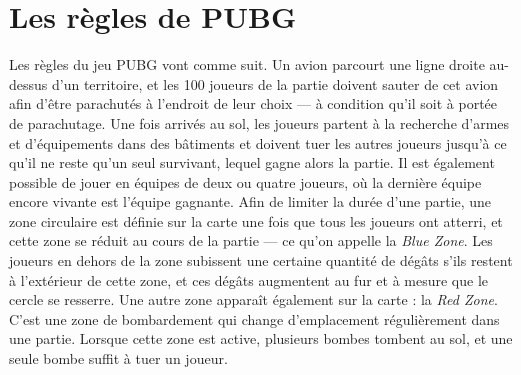 \section{Les règles de PUBG}
Les r\`egles du jeu PUBG vont comme suit.
Un avion parcourt une ligne droite au-dessus d'un territoire, et les 100 joueurs de la partie doivent sauter de cet avion afin d'être parachutés à l'endroit de leur choix --- à condition qu'il soit à portée de parachutage. Une fois arrivés au sol, les joueurs partent à la recherche d'armes et d'équipements dans des bâtiments et doivent tuer les autres joueurs jusqu'à ce qu'il ne reste qu'un seul survivant, lequel gagne alors la partie. Il est également possible de jouer en \'equipes de deux ou quatre joueurs, o\`u la dernière équipe encore vivante est l'\'equipe gagnante. Afin de limiter la durée d'une partie, une zone circulaire est définie sur la carte une fois que tous les joueurs ont atterri, et cette zone se réduit au cours de la partie --- ce qu'on appelle la \emph{Blue Zone}. Les joueurs en dehors de la zone subissent une certaine quantité de dégâts s'ils restent \`a l'ext\'erieur de cette zone, et ces dégâts augmentent au fur et à mesure que le cercle se resserre. Une autre zone apparaît également sur la carte : la \emph{Red Zone}. C'est une zone de bombardement qui change d'emplacement régulièrement dans une partie. Lorsque cette zone est active, plusieurs bombes tombent au sol, et une seule bombe suffit à tuer un joueur.
%



